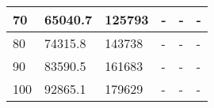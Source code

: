 \begin{table}[h]
\begin{tabular}{|l|l|l|l|l|l|}
70                                                                         & 65040.7                              & 125793                                & -                                     & -                                     & -                                     \\ \hline
80                                                                         & 74315.8                              & 143738                                & -                                     & -                                     & -                                     \\ \hline
90                                                                         & 83590.5                              & 161683                                & -                                     & -                                     & -                                     \\ \hline
100                                                                        & 92865.1                              & 179629                                & -                                     & -                                     & -                                     \\ \hline
\end{tabular}
\end{table}


